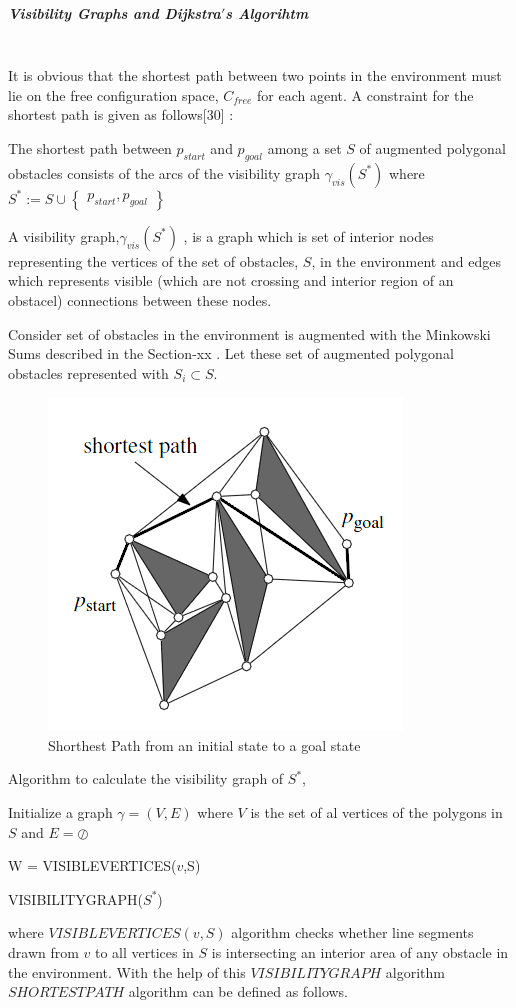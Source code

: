 \documentclass[twoside]{article}
\begin{document}
		\subparagraph{Visibility Graphs and Dijkstra$'$s Algorihtm}\hspace{0pt} \\
It is obvious that the shortest path between two points in the environment must lie on the free configuration space, $C_{free}$ for each agent. A constraint for the shortest path is given as follows[30] : 
\begin{displayquote}
The shortest path between $p_{start}$ and $p_{goal}$ among a set $S$ of augmented polygonal obstacles consists of the arcs of the visibility graph $\gamma_{vis}(S^*)$ where $S^* := S \cup \begin{Bmatrix}
p_{start}, p_{goal}
\end{Bmatrix}$
\end{displayquote}
A visibility graph,$\gamma_{vis}(S^*)$ , is a graph which is set of interior nodes representing the vertices of the set of obstacles, $S$, in the environment and edges which represents visible (which are not crossing and interior region of an obstacel) connections between these nodes. 

Consider set of obstacles in the environment is augmented with the Minkowski Sums described in the Section-xx . Let these set of augmented polygonal obstacles represented with $S_i \subset S$. 
	\begin{figure}[H]
		\caption{Shorthest Path from an initial state to a goal state}
		\centering
		\includegraphics[scale = 0.4]{shortest}
	\end{figure} 
	Algorithm to calculate the visibility graph of $S^*$,
	
	\begin{algorithm}[H]
		
		Initialize a graph $\gamma = (V,E)$ where $V$ is the set of al vertices of the polygons in $S$ and $E = \oslash$ 
		
		{		
			W = VISIBLEVERTICES($v$,S)\;}
		
		
		\caption{VISIBILITYGRAPH($S^*$)}
	\end{algorithm}
	where $VISIBLEVERTICES(v,S)$ algorithm checks whether line segments drawn from $v$ to all vertices in $S$ is intersecting an interior area of any obstacle in the environment. With the help of this $VISIBILITYGRAPH$ algorithm $SHORTESTPATH$ algorithm can be defined as follows.
	
\end{document}
